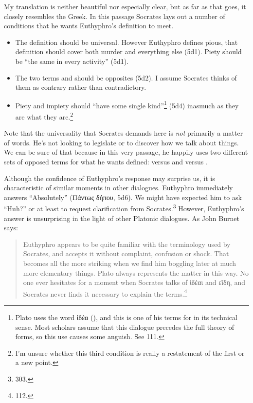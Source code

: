 \documentclass[11pt]{article}
\begin{document}
My translation is neither beautiful nor especially clear, but as far as that goes, it closely resembles the Greek.  In this passage Socrates lays out a number of conditions that he wants Euthyphro's definition to meet.

\begin{itemize}

    \item The definition should be universal.  However Euthyphro defines pious, that definition should cover both murder and everything else (5d1).  Piety should be ``the same in every activity'' (5d1).
    \item The two terms  and  should be opposites (5d2).  I assume Socrates thinks of them as contrary rather than contradictory.
    \item Piety and impiety should ``have some single kind''\footnote{Plato uses the word {\g ἰδέα} (), and this is one of his terms for  in its technical sense.  Most scholars assume that this dialogue precedes the full theory of forms, so this use causes some anguish.  See \citet{burnet1924} 111.} (5d4) inasmuch as they are what they are.\footnote{I'm unsure whether this third condition is really a restatement of the first or a new point.}

\end{itemize}

Note that the universality that Socrates demands here is \emph{not} primarily a matter of words.  He's not looking to legislate or to discover how we talk about things.  We can be sure of that because in this very passage, he happily uses two different sets of opposed terms for what he wants defined:  versus  and  versus .

Although the confidence of Euthyphro's response may surprise us, it is characteristic of similar moments in other dialogues.  Euthyphro immediately answers ``Absolutely'' ({\g Πάντως δήπου}, 5d6).  We might have expected him to ask ``Huh?'' or at least to request clarification from Socrates.\footnote{\citet{nehamas1975} 303.}  However, Euthyphro's answer is unsurprising in the light of other Platonic dialogues.  As John Burnet says:

\begin{quote}

    Euthyphro appears to be quite familiar with the terminology used by Socrates, and accepts it without complaint, confusion or shock.  That becomes all the more striking when we find him boggling later at much more elementary things.  Plato always represents the matter in this way.  No one ever hesitates for a moment when Socrates talks of {\g ἰδέαι} and {\g εἴδη}, and Socrates never finds it necessary to explain the terms.\footnote{\citet{burnet1924} 112.}

\end{quote}
\end{document}
